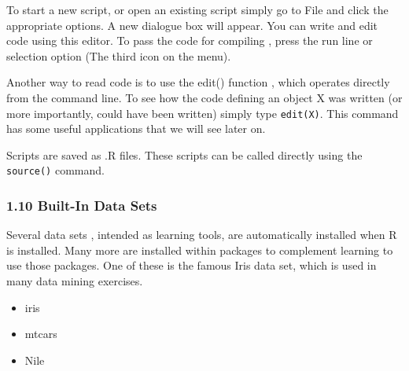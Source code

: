 \documentclass{beamer}
\begin{document}
	\begin{frame}
		
		
		To start a new script, or open an existing script simply go to File and click the appropriate
		options. A new dialogue box will appear. You can write and edit code using this editor.
		To pass the code for compiling , press the run line or selection option (The third icon
		on the menu).
		
	\end{frame}
	\begin{frame}
		
		Another way to read code is to use the edit() function , which operates directly from the
		command line. To see how the code defining an object X was written (or more importantly,
		could have been written) simply type \texttt{edit(X)}. This command has some useful applications
		that we will see later on.
		
	\end{frame}
	\begin{frame}
		
		
		Scripts are saved as .R files. These scripts can be called directly using the \texttt{source()} command.
		
	\end{frame}
	\begin{frame}
		\frametitle{1.10 Built-In Data Sets}
		Several data sets , intended as learning tools, are automatically installed when R is installed.
		Many more are installed within packages to complement learning to use those packages. One
		of these is the famous Iris data set, which is used in many data mining exercises.
		
		\begin{itemize}
			\item iris
			\item mtcars
			\item Nile
		\end{itemize}
		
		
	\end{frame}
	
\end{document}
